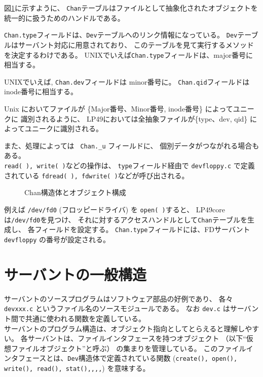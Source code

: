 {図\ref{fig:Chan-table}に示すように、
{\tt Chan}テーブルはファイルとして抽象化されたオブジェクトを
統一的に扱うためのハンドルである。

{\tt Chan.type}フィールドは、{\tt Dev}テーブルへのリンク情報になっている。
{\tt Dev}テーブルはサーバント対応に用意されており、
このテーブルを見て実行するメソッドを決定するわけである。
UNIXでいえば{\tt Chan.type}フィールドは、major番号に相当する。

UNIXでいえば, {\tt Chan.dev}フィールドは minor番号に。
{\tt Chan.qid}フィールドは inode番号に相当する。

Unix においてファイルが \{Major番号、Minor番号, inode番号\} によってユニークに
識別されるように、
LP49においては全抽象ファイルが\{type、dev, qid\} によってユニークに識別される。

また、処理によっては \verb| Chan._u| フィールドに、
個別データがつながれる場合もある。
\\

{\tt read( ), write( )}などの操作は、 
{\tt type}フィールド経由で {\tt devfloppy.c} で定義されている 
{\tt fdread( ), fdwrite( )}などが呼び出される。

\begin{figure}[hbt]
  \begin{center}
   \epsfxsize=440pt
    \caption{Chan構造体とオブジェクト構成}
    \label{fig:Chan-table}
  \end{center}
\end{figure}


 例えば {\tt /dev/fd0} (フロッピードライバ) を {\tt open( )}すると、
LP49coreは{\tt /dev/fd0}を見つけ、
それに対するアクセスハンドルとして{\tt Chan}テーブルを生成し、
各フィールドを設定する。
{\tt Chan.type}フィールドには、FDサーバント {\tt devfloppy} 
の番号が設定される。



\section{サーバントの一般構造}

  サーバントのソースプログラムはソフトウェア部品の好例であり、
各々 {\tt devxxx.c} というファイル名のソースモジュールである。
なお {\tt dev.c} はサーバント間で共通に使われる関数を定義している。
\\

サーバントのプログラム構造は、オブジェクト指向としてとらえると理解しやすい。
各サーバントは、ファイルインタフェースを持つオブジェクト
（以下``仮想ファイルオブジェクト''と呼ぶ）
の集まりを管理している。
このファイルインタフェースとは、{\tt Dev}構造体で定義されている関数
({\tt create(), open(), write(), read(), stat(),,,,})
を意味する。

}
